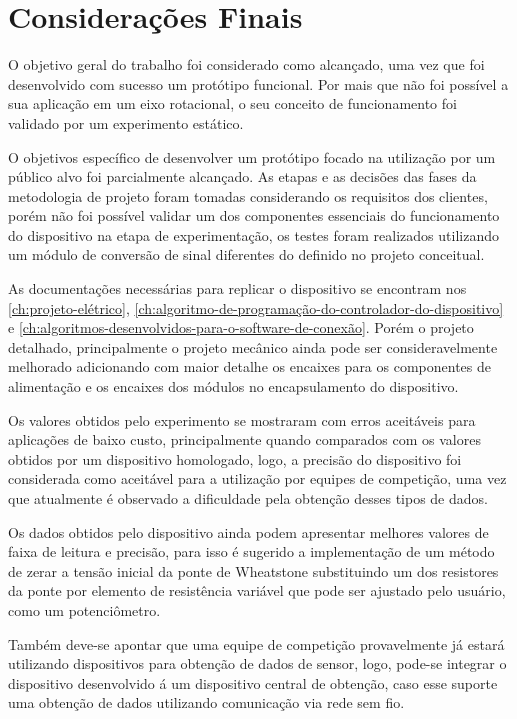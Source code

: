 

\chapter{Considerações Finais}

O objetivo geral do trabalho foi considerado como alcançado, uma vez que foi desenvolvido com sucesso um protótipo funcional.
Por mais que não foi possível a sua aplicação em um eixo rotacional, o seu conceito de funcionamento foi validado por um experimento estático.

O objetivos específico de desenvolver um protótipo focado na utilização por um público alvo foi parcialmente alcançado.
As etapas e as decisões das fases da metodologia de projeto foram tomadas considerando os requisitos dos clientes, porém não foi possível validar
um dos componentes essenciais do funcionamento do dispositivo na etapa de experimentação, os testes foram realizados utilizando um módulo de conversão
de sinal diferentes do definido no projeto conceitual.

As documentações necessárias para replicar o dispositivo se encontram nos \autoref{ch:projeto-elétrico}, \autoref{ch:algoritmo-de-programação-do-controlador-do-dispositivo}
e \autoref{ch:algoritmos-desenvolvidos-para-o-software-de-conexão}.
Porém o projeto detalhado, principalmente o projeto mecânico ainda pode ser consideravelmente melhorado adicionando com maior detalhe os encaixes para os componentes de alimentação
e os encaixes dos módulos no encapsulamento do dispositivo.

Os valores obtidos pelo experimento se mostraram com erros aceitáveis para aplicações de baixo custo, principalmente quando comparados com os
valores obtidos por um dispositivo homologado, logo, a precisão do dispositivo foi considerada como aceitável para a utilização por equipes de competição,
uma vez que atualmente é observado a dificuldade pela obtenção desses tipos de dados.

Os dados obtidos pelo dispositivo ainda podem apresentar melhores valores de faixa de leitura e precisão, para isso é sugerido a implementação de um método de zerar a tensão
inicial da ponte de Wheatstone substituindo um dos resistores da ponte por elemento de resistência variável que pode ser ajustado pelo usuário, como um potenciômetro.

Também deve-se apontar que uma equipe de competição provavelmente já estará utilizando dispositivos para obtenção de dados de sensor, logo, pode-se integrar o dispositivo desenvolvido
á um dispositivo central de obtenção, caso esse suporte uma obtenção de dados utilizando comunicação via rede sem fio.

